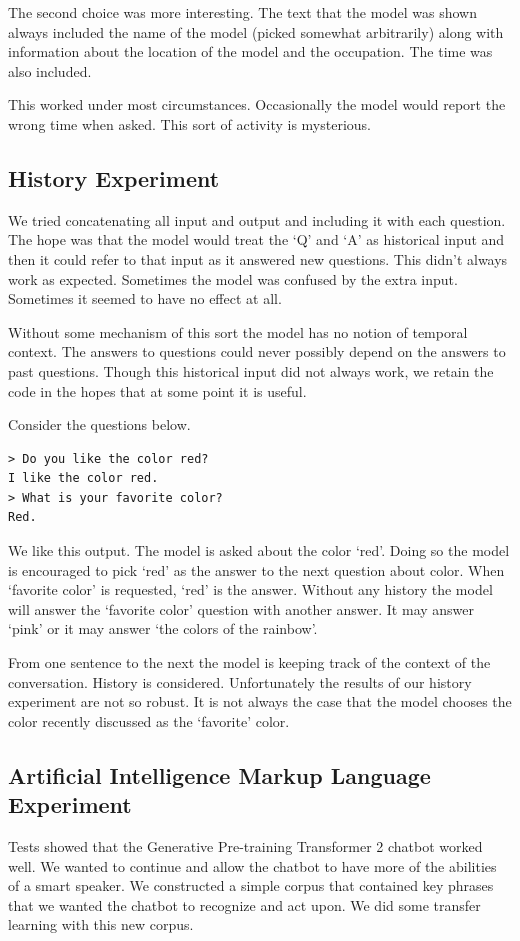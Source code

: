 The second choice was more interesting. The text that the model was shown always included the name of the model (picked somewhat arbitrarily) along with information about the location of the model and the occupation. The time was also included.

This worked under most circumstances. Occasionally the model would report the wrong time when asked. This sort of activity is mysterious.

\subsection{History Experiment}
We tried concatenating all input and output and including it with each question. The hope was that the model would treat the `Q' and `A' as historical input and then it could refer to that input as it answered new questions. This didn't always work as expected. Sometimes the model was confused by the extra input. Sometimes it seemed to have no effect at all.

Without some mechanism of this sort the model has no notion of temporal context. The answers to questions could never possibly depend on the answers to past questions. Though this historical input did not always work, we retain the code in the hopes that at some point it is useful.

Consider the questions below.
\begin{verbatim}
> Do you like the color red?
I like the color red.
> What is your favorite color?
Red.
\end{verbatim}
We like this output. The model is asked about the color `red'. Doing so the model is encouraged to pick `red' as the answer to the next question about color. When `favorite color' is requested, `red' is the answer. Without any history the model will answer the `favorite color' question with another answer. It may answer `pink' or it may answer `the colors of the rainbow'. 

From one sentence to the next the model is keeping track of the context of the conversation. History is considered. Unfortunately the results of our history experiment are not so robust. It is not always the case that the model chooses the color recently discussed as the `favorite' color.

\subsection{Artificial Intelligence Markup Language Experiment}
Tests showed that the Generative Pre-training Transformer 2 chatbot worked well. We wanted to continue and allow the chatbot to have more of the abilities of a smart speaker. We constructed a simple corpus that contained key phrases that we wanted the chatbot to recognize and act upon. We did some transfer learning with this new corpus.

